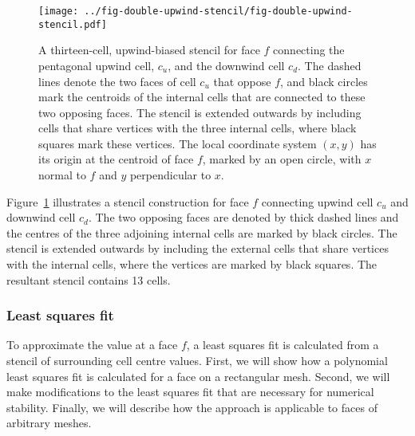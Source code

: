 \begin{figure}
	\centering
	\texttt{[image: ../fig-double-upwind-stencil/fig-double-upwind-stencil.pdf]}
	\caption{A thirteen-cell, upwind-biased stencil for face $f$ connecting the pentagonal upwind cell, $c_u$, and the downwind cell $c_d$.  The dashed lines denote the two faces of cell $c_u$ that oppose $f$, and black circles mark the centroids of the internal cells that are connected to these two opposing faces.  The stencil is extended outwards by including cells that share vertices with the three internal cells, where black squares mark these vertices.  The local coordinate system $(x, y)$ has its origin at the centroid of face $f$, marked by an open circle, with $x$ normal to $f$ and $y$ perpendicular to $x$.}
	\label{fig:double-upwind-stencil}
\end{figure}

Figure~\ref{fig:double-upwind-stencil} illustrates a stencil construction for face $f$ connecting upwind cell $c_u$ and downwind cell $c_d$.  The two opposing faces are denoted by thick dashed lines and the centres of the three adjoining internal cells are marked by black circles.  The stencil is extended outwards by including the external cells that share vertices with the internal cells, where the vertices are marked by black squares.  The resultant stencil contains 13 cells.


\subsubsection{Least squares fit}
To approximate the value at a face $f$, a least squares fit is calculated from a stencil of surrounding cell centre values.  First, we will show how a polynomial least squares fit is calculated for a face on a rectangular mesh.  Second, we will make modifications to the least squares fit that are necessary for numerical stability.  Finally, we will describe how the approach is applicable to faces of arbitrary meshes.  

